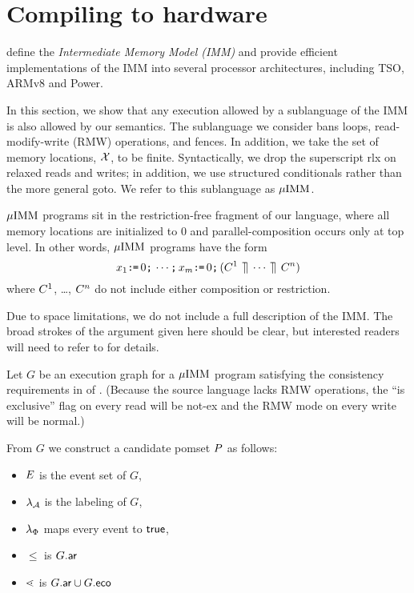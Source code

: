 \section{Compiling to hardware}

\citet{DBLP:journals/pacmpl/PodkopaevLV19} define the \emph{Intermediate
  Memory Model (IMM)} and provide efficient implementations of the IMM into
several processor architectures, including TSO, ARMv8 and Power.

In this section, we show that any execution allowed by a sublanguage of the
IMM is also allowed by our semantics.  The sublanguage we consider bans
loops, read-modify-write (RMW) operations, and fences.  In addition, we take
the set of memory locations, $\mathcal{X}$, to be finite.  Syntactically, we drop
the superscript \textsf{rlx} on relaxed reads and writes; in addition, we use
structured conditionals rather than the more general \textsf{goto}.  We refer
to this sublanguage as $\mu\text{IMM}$.

$\mu\text{IMM}$ programs sit in the restriction-free fragment of our language, where
all memory locations are initialized to $0$ and parallel-composition occurs
only at top level.  In other words, $\mu\text{IMM}$ programs have the form
\begin{displaymath}
  {x_1}\texttt{:}\mkern-1mu\texttt{=}\,{0}\texttt{;}\,
  \cdots\texttt{;}\,
  {x_m}\texttt{:}\mkern-1mu\texttt{=}\,{0}\texttt{;}\,
  (C^1 \,\mathbin{\rrceil}\, \cdots \,\mathbin{\rrceil}\, C^n)
\end{displaymath}
where $C^1$, \ldots, $C^n$ do not include either composition or
restriction.

Due to space limitations, we do not include a full description of the IMM.
The broad strokes of the argument given here should be clear, but interested
readers will need to refer to \citep{DBLP:journals/pacmpl/PodkopaevLV19} for
details.

Let $G$ be an execution graph for a $\mu\text{IMM}$ program satisfying the
consistency requirements in  of
\citep{DBLP:journals/pacmpl/PodkopaevLV19}. (Because the source language
lacks RMW operations, the ``is exclusive'' flag on every read will be
\textsf{not-ex} and the RMW mode on every write will be \textsf{normal}.)

From $G$ we construct a candidate pomset $P$ as follows:
\begin{itemize}
\item $E$ is the event set of $G$,
\item $\lambda_{\mathcal{A}}$ is the labeling of $G$,
\item $\lambda_{\Phi}$ maps every event to $\mathsf{true}$,
\item $\leq$ is $G.{\mathrel{\mathsf{ar}}}$
\item $\lessdot$ is $G.{\mathrel{\mathsf{ar}}}\cup G.{\mathrel{\mathsf{eco}}}$
\end{itemize}

